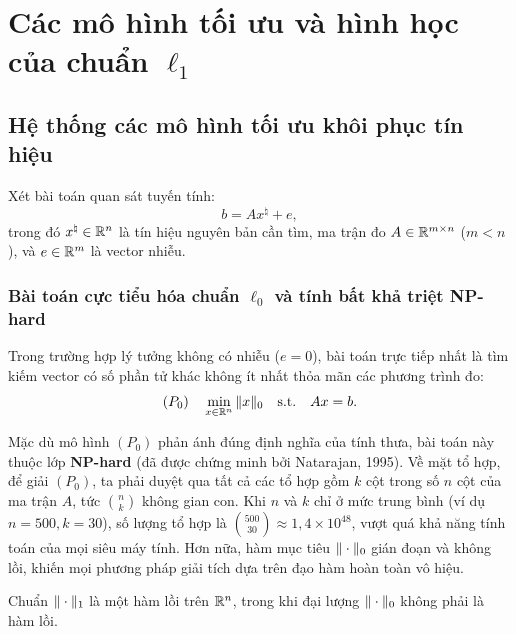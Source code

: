 \chapter{Các mô hình tối ưu và hình học của chuẩn $\ell_1$}
\label{chap:mo_hinh_toi_uu}

\section{Hệ thống các mô hình tối ưu khôi phục tín hiệu}
Xét bài toán quan sát tuyến tính:
\begin{equation}
    b = A x^\natural + e,
\end{equation}
trong đó $x^\natural \in \mathbb{R}^n$ là tín hiệu nguyên bản cần tìm, ma trận đo $A \in \mathbb{R}^{m \times n}$ ($m < n$), và $e \in \mathbb{R}^m$ là vector nhiễu.

\subsection{Bài toán cực tiểu hóa chuẩn $\ell_0$ và tính bất khả triệt NP-hard}
Trong trường hợp lý tưởng không có nhiễu ($e = 0$), bài toán trực tiếp nhất là tìm kiếm vector có số phần tử khác không ít nhất thỏa mãn các phương trình đo:
\begin{equation}
    (P_0) \quad \min_{x \in \mathbb{R}^n} \|x\|_0 \quad \text{s.t.} \quad Ax = b.
\end{equation}

Mặc dù mô hình $(P_0)$ phản ánh đúng định nghĩa của tính thưa, bài toán này thuộc lớp \textbf{NP-hard} (đã được chứng minh bởi Natarajan, 1995). Về mặt tổ hợp, để giải $(P_0)$, ta phải duyệt qua tất cả các tổ hợp gồm $k$ cột trong số $n$ cột của ma trận $A$, tức $\binom{n}{k}$ không gian con. Khi $n$ và $k$ chỉ ở mức trung bình (ví dụ $n = 500, k = 30$), số lượng tổ hợp là $\binom{500}{30} \approx 1{,}4 \times 10^{48}$, vượt quá khả năng tính toán của mọi siêu máy tính. Hơn nữa, hàm mục tiêu $\|\cdot\|_0$ gián đoạn và không lồi, khiến mọi phương pháp giải tích dựa trên đạo hàm hoàn toàn vô hiệu.

\begin{theorem}
Chuẩn $\|\cdot\|_1$ là một hàm lồi trên $\mathbb{R}^n$, trong khi đại lượng $\|\cdot\|_0$ không phải là hàm lồi.
\end{theorem}

